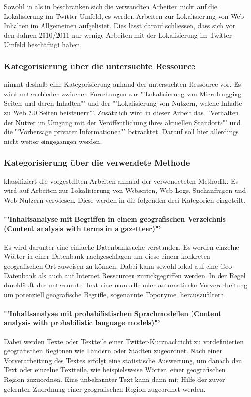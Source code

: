 		Sowohl in \cite{Hecht2011} als in \cite{Cheng2010} beschränken sich die verwandten Arbeiten nicht auf die Lokalisierung im Twitter-Umfeld, es werden Arbeiten zur Lokalisierung von Web-Inhalten im Allgemeinen aufgelistet. 
		Dies lässt darauf schliessen, dass sich vor den Jahren 2010/2011 nur wenige Arbeiten mit der Lokalisierung im Twitter-Umfeld beschäftigt haben.  
		
		\subsubsection{Kategorisierung über die untersuchte Ressource}
		\cite{Hecht2011} nimmt deshalb eine Kategorisierung anhand der untersuchten Ressource vor. 
		Es wird unterschieden zwischen Forschungen zur "'Lokalisierung von Microblogging-Seiten und deren Inhalten"' und der "'Lokalisierung von Nutzern, welche Inhalte zu Web 2.0 Seiten beisteuern"'. 
		Zusätzlich wird in dieser Arbeit das "'Verhalten der Nutzer im Umgang mit der Veröffentlichung ihres aktuellen Standorts"' und die "'Vorhersage privater Informationen"' betrachtet. Darauf soll hier allerdings nicht weiter eingegangen werden.      

		\subsubsection{Kategorisierung über die verwendete Methode}

		\cite{Cheng2010} klassifiziert die vorgestellten Arbeiten anhand der verwendeteten Methodik. 
		Es wird auf Arbeiten zur Lokalisierung von Webseiten, Web-Logs, Suchanfragen und Web-Nutzern verwiesen. 
		Diese werden in die folgenden drei Kategorien eingeteilt.

		\paragraph*{"'Inhaltsanalyse mit Begriffen in einem geografischen Verzeichnis (Content analysis with terms in a gazetteer)"'}  
		Es wird darunter eine einfache Datenbanksuche verstanden. 
		Es werden einzelne Wörter in einer Datenbank nachgeschlagen um diese einem konkreten geografischen Ort zuweisen zu können.
		Dabei kann sowohl lokal auf eine Geo-Datenbank als auch auf Internet Ressourcen zurückgegriffen werden.  
		In der Regel durchläuft der untersuchte Text eine manuelle oder automatische Vorverarbeitung um potenziell geografische Begriffe, sogenannte Toponyme, herauszufiltern. 

		\paragraph*{"'Inhaltsanalyse mit probabilistischen Sprachmodellen (Content analysis with probabilistic language models)"'}
		Dabei werden Texte oder Textteile einer Twitter-Kurznachricht zu vordefinierten geografischen Regionen wie Ländern oder Städten zugeordnet. 
		Nach einer Vorverarbeitung des Textes erfolgt eine statistische Auswertung, um danach den Text oder einzelne Textteile, wie beispielsweise Wörter, einer geografischen Region zuzuordnen. 
		Eine unbekannter Text kann dann mit Hilfe der zuvor gelernten Zuordnung einer geografischen Region zugeordnet werden.

